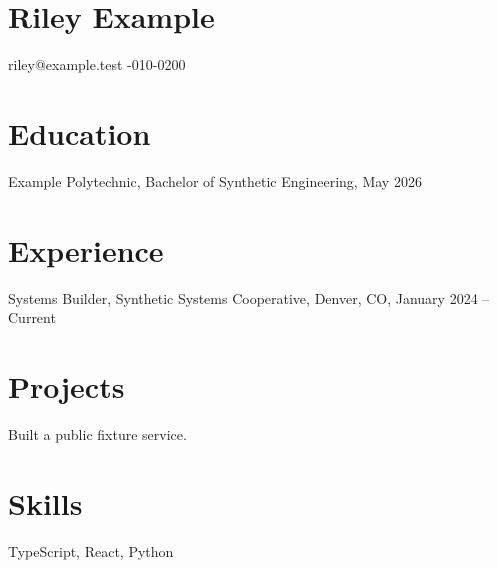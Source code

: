 \documentclass{article}
\begin{document}
\section*{Riley Example}
riley@example.test -010-0200
\section*{Education}
Example Polytechnic, Bachelor of Synthetic Engineering, May 2026
\section*{Experience}
Systems Builder, Synthetic Systems Cooperative, Denver, CO, January 2024 -- Current
\section*{Projects}
Built a public fixture service.
\section*{Skills}
TypeScript, React, Python
\end{document}
